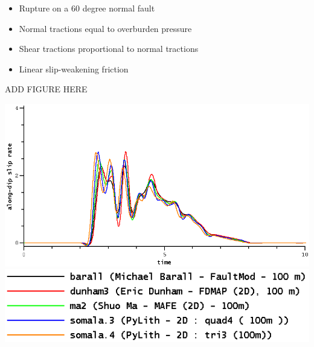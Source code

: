 \documentclass[pdftex,cig,slideColor]{pp4slides}
\begin{document}
  \begin{itemize}
  \item Rupture on a 60 degree normal fault
  \item Normal tractions equal to overburden pressure
  \item Shear tractions proportional to normal tractions
  \item Linear slip-weakening friction
  \end{itemize}
  
  \vfill
  \begin{center}
    ADD FIGURE HERE
  \end{center}
  

  \vfill
  \begin{center}
    \includegraphics[scale=0.6]{figs/tpv210-2d}
    \includegraphics[scale=0.6]{figs/tpv210-2d_legend}
  \end{center}
  \vfill
  
\end{document}
